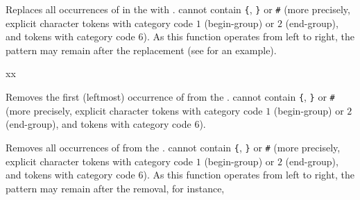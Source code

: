 \documentclass[oneside]{book}
\begin{document}
\begin{function}{\tlVarReplaceAll}
\begin{syntax}
   
\end{syntax}
Replaces all occurrences of  in the
 with . 
cannot contain \verb|{|, \verb|}| or \verb|#|
(more precisely, explicit character tokens with category code $1$
(begin-group) or $2$ (end-group), and tokens with category code $6$).
As this function
operates from left to right, the pattern 
may remain after the replacement (see  for an example).
\begin{demohigh}
\tlSet {}
\tlVarReplaceAll {} {xx}
\tlUse \lTmpaTl
\end{demohigh}
\end{function}

\begin{function}{\tlVarRemoveOnce}
\begin{syntax}
  
\end{syntax}
Removes the first (leftmost) occurrence of  from the
.  cannot contain \verb|{|, \verb|}| or \verb|#|
(more precisely, explicit character tokens with category code $1$
(begin-group) or $2$ (end-group), and tokens with category code $6$).
\begin{demohigh}
\tlSet {}
\tlVarRemoveOnce {}
\tlUse \lTmpaTl
\end{demohigh}
\end{function}

\begin{function}{\tlVarRemoveAll}
\begin{syntax}
  
\end{syntax}
Removes all occurrences of  from the
.  cannot contain \verb|{|, \verb|}| or \verb|#|
(more precisely, explicit character tokens with category code $1$
(begin-group) or $2$ (end-group), and tokens with category code $6$).
As this function
operates from left to right, the pattern 
may remain after the removal, for instance,
\begin{demohigh}
\tlSet {}
\tlVarRemoveAll {}
\tlUse \lTmpaTl
\end{demohigh}
\end{function}
\end{document}
